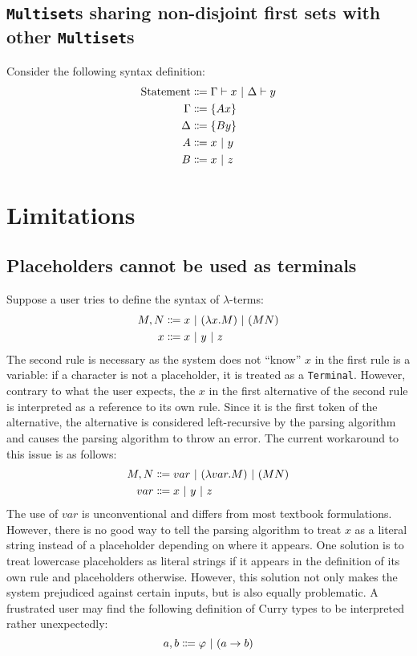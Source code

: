\subsection{\texorpdfstring{\lstinline{Multiset}}{Multiset}s sharing non-disjoint first sets with other \texorpdfstring{\lstinline{Multiset}}{Multiset}s}
Consider the following syntax definition:
\begin{align*}
    \text{Statement} &\Coloneqq \Gamma \vdash x \ |\  \Delta \vdash y \\
    \Gamma &\Coloneqq \{ Ax \} \\
    \Delta &\Coloneqq \{ By \} \\
    A &\Coloneqq x \ |\  y \\ 
    B &\Coloneqq x \ |\  z
\end{align*}

\section{Limitations}
\subsection{Placeholders cannot be used as terminals}
Suppose a user tries to define the syntax of $\lambda$-terms:
\begin{align*}
    M, N &\Coloneqq x \ |\  (\lambda x. M) \ |\  (MN) \\
    x &\Coloneqq x \ |\  y \ |\  z
\end{align*}
The second rule is necessary as the system does not ``know'' $x$ in the first rule is a variable: if a character is not a placeholder, it is treated as a \lstinline{Terminal}. However, contrary to what the user expects, the $x$ in the first alternative of the second rule is interpreted as a reference to its own rule. Since it is the first token of the alternative, the alternative is considered left-recursive by the parsing algorithm and causes the parsing algorithm to throw an error. The current workaround to this issue is as follows:
\begin{align*}
    M, N &\Coloneqq var \ |\  (\lambda var. M) \ |\  (MN) \\
    var &\Coloneqq x \ |\  y \ |\  z
\end{align*}
The use of $var$ is unconventional and differs from most textbook formulations. However, there is no good way to tell the parsing algorithm to treat $x$ as a literal string instead of a placeholder depending on where it appears. One solution is to treat lowercase placeholders as literal strings if it appears in the definition of its own rule and placeholders otherwise. However, this solution not only makes the system prejudiced against certain inputs, but is also equally problematic. A frustrated user may find the following definition of Curry types to be interpreted rather unexpectedly:
\[
  a, b \Coloneqq \varphi \ |\  (a \to b)
\]